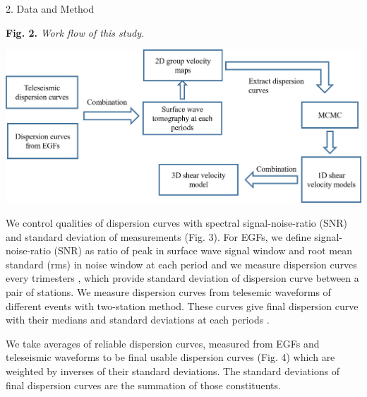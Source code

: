 \documentclass[
    landscape,      %
    paperwidth = 1120mm,
    paperheight = 820mm,
    fontscale = 0.45,
    margin = 1.7cm,
]{baposter}
\begin{document}
\begin{poster}
\begin{posterbox}[column=0, below=auto]{2. Data and Method}
\begin{center}

\begin{minipage}{0.3\textwidth}
\footnotesize
\textbf{Fig. 2.}
\itshape
Work flow of this study.
\end{minipage}
\begin{minipage}{0.48\textwidth}
\includegraphics[width=\textwidth]{./images/Workflow.png}
\end{minipage}
\hspace{0.1cm}
\end{center}
% 
We control qualities of dispersion curves with spectral signal-noise-ratio (SNR) and standard deviation of measurements (Fig. 3).
For EGFs, we define signal-noise-ratio (SNR) as ratio of peak in surface wave signal window and root mean standard (rms) in noise window at each period and we measure dispersion curves every trimesters
, which provide standard deviation of dispersion curve between a pair of stations.
We measure dispersion curves from telesemic waveforms of different events with two-station method.
These curves give final dispersion curve with their medians and standard deviations at each periods .

We take averages of reliable dispersion curves, measured from EGFs and teleseismic waveforms to be final
usable dispersion curves (Fig. 4) which are weighted by inverses of their standard deviations. The standard
deviations of final dispersion curves are the summation of those constituents.

\hspace{0.15cm}


\end{posterbox}
\end{poster}
\end{document}
